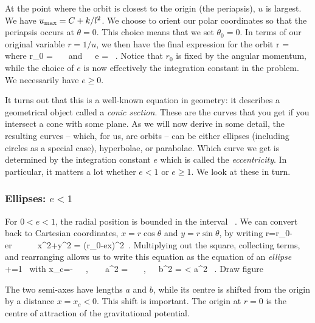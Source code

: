 \para
{\co 
At the point where the orbit is closest to the origin (the periapsis), $u$ is largest. We  have $u_{\rm max} = C+k/l^2$. We choose to orient our polar coordinates so that the periapsis occurs at $\theta=0$. This choice means that we  set $\theta_0=0$. In terms of our original variable $r=1/u$, we then have the final expression for the orbit
%
\be r = \label{roundandround}\ee
%
where
%
\be r_0 = \ \ \  {\rm and}\ \ \  e = \ . \label{rzeroande}\ee
%
}
Notice that $r_0$ is fixed by the angular momentum, while the choice of $e$ is now effectively the integration constant in the problem. We necessarily have $e\geq 0$.

\para
It turns out that  this is a well-known equation in geometry: it describes a geometrical object called  a {\it conic section}. These are the curves that you get if you intersect a cone with some plane. As we will now derive in some detail, the resulting curves -- which, for us, are orbits -- can be either ellipses (including circles as a special case), hyperbolae, or parabolae. Which curve we get is determined by the  integration constant $e$ which is called the {\it eccentricity}. In particular, it matters a lot whether $e<1$ or $e\geq 1$. We look at these in turn.


{\co 
\subsubsection*{Ellipses: $e<1$}

For $0<e<1$, the radial position  is bounded in the interval
%
\be {}\in[1-e,1+e]\ .\ee
%
We can convert  back to Cartesian coordinates, $x=r\cos\theta$ and $y=r\sin\theta$, by writing
%
\be r=r_0-er\cos\theta\ \ \  \Longrightarrow   \ \ \ x^2+y^2 = (r_0-ex)^2\ .\ee
%
Multiplying out the square, collecting terms, and rearranging allows us to write this equation as the equation of an {\it ellipse}
%
\be {}+=1\ \ee
%
with
%
\be x_c=-\ \ \ ,\ \ \ \ a^2 = \ \  \ ,\ \ \ b^2 =  < a^2 \ .\label{aandb}\ee
%
%
{\cblue Draw figure} }The two semi-axes  have lengths $a$ and $b$, while its centre is shifted from the origin by a distance  $x=x_c<0$.   This shift is important. The origin at $r=0$ is the centre of attraction of the gravitational potential. 




